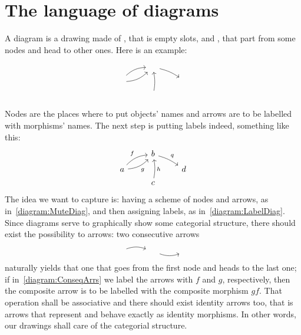 
\section{The language of diagrams}

A diagram is a drawing made of , that is empty slots, and , that part from some nodes and head to other ones. Here is an example:
\begin{equation}\begin{tikzcd}[row sep=tiny]
  & \phantom\square \ar[dr, bend left=10] \\
\phantom\square \ar[ur, bend left=20] \ar[ur, bend right=20, swap] & & \phantom\square  \\
  & \phantom\square \ar[uu, bend right=10, swap] 
\end{tikzcd}\label{diagram:MuteDiag}\end{equation}
%
Nodes are the places where to put objects' names and arrows are to be labelled with morphisms' names. The next step is putting labels indeed, something like this:
\begin{equation}\begin{tikzcd}[row sep=tiny]
  & b \ar["q", dr, bend left=10] \\
a \arrow["f", ur, bend left=20] \arrow["g", ur, bend right=20, swap] & & d  \\
  & c \arrow["h", uu, bend right=10, swap] 
\end{tikzcd}\label{diagram:LabelDiag}\end{equation}
%
The idea we want to capture is: having a scheme of nodes and arrows, as in~\eqref{diagram:MuteDiag}, and then assigning labels, as in~\eqref{diagram:LabelDiag}. Since diagrams serve to graphically show some categorial structure, there should exist the possibility to  arrows: two consecutive arrows
\begin{equation}\begin{tikzcd}
\phantom\square \ar[r, bend left=20] & \phantom\square \ar[r, swap, bend right=20] & \phantom\square
\end{tikzcd}\label{diagram:ConseqArrs}\end{equation}
naturally yields that one that goes from the first node and heads to the last one; if in~\eqref{diagram:ConseqArrs} we label the arrows with \(f\) and \(g\), respectively, then the composite arrow is to be labelled with the composite morphism \(gf\). That operation shall be associative and there should exist identity arrows too, that is arrows that represent and behave exactly as identity morphisms. In other words, our drawings shall care of the categorial structure.

